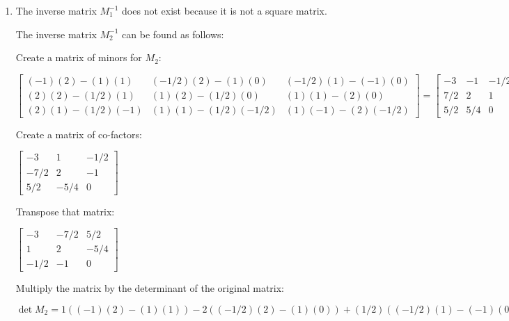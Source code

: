 \documentclass{article}
\begin{document}
\begin{enumerate}
{        \begin{enumerate}[label=\roman*.]
            \item {
                The inverse matrix $M_{1}^{-1}$ does not exist because it is not a square matrix.
                
                The inverse matrix $M_{2}^{-1}$ can be found as follows:
                
                Create a matrix of minors for $M_{2}$:
                
                $
                \begin{bmatrix}
                (-1)(2) - (1)(1) & (-1/2)(2) - (1)(0) & (-1/2)(1) - (-1)(0) \\
                (2)(2) - (1/2)(1) & (1)(2) - (1/2)(0) & (1)(1) - (2)(0) \\
                (2)(1) - (1/2)(-1) & (1)(1) - (1/2)(-1/2) & (1)(-1) - (2)(-1/2)
                \end{bmatrix}
                =
                \begin{bmatrix}
                -3  & -1 & -1/2 \\
                7/2 & 2 & 1 \\
                5/2 & 5/4 & 0
                \end{bmatrix}
                $
                
                Create a matrix of co-factors:
                
                $
                \begin{bmatrix}
                -3 & 1 & -1/2 \\
                -7/2 & 2 & -1 \\
                5/2 & -5/4 & 0
                \end{bmatrix}
                $
                
                Transpose that matrix:
                
                $
                \begin{bmatrix}
                -3 & -7/2 & 5/2 \\
                1 & 2 & -5/4 \\
                -1/2 & -1 & 0
                \end{bmatrix}
                $
                
                Multiply the matrix by the determinant of the original matrix:
                
                $
                \det M_{2} =
                1((-1)(2) - (1)(1)) -
                2((-1/2)(2) - (1)(0)) + 
                (1/2)((-1/2)(1) - (-1)(0))
                = -4/5
                $
                
}
\end{enumerate}}
\end{enumerate}
\end{document}
